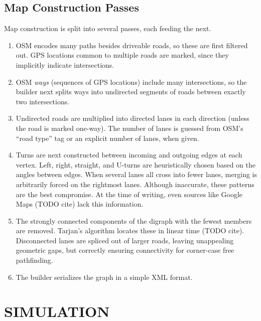 \documentclass[letterpaper, 10 pt, conference]{ieeeconf}  %
\begin{document}
\subsection{Map Construction Passes}


Map construction is split into several passes, each feeding the next.
\begin{enumerate}
  \item OSM encodes many paths besides driveable roads, so these are first
        filtered out. GPS locations common to multiple roads are marked, since
        they implicitly indicate intersections.
  \item OSM \emph{ways} (sequences of GPS locations) include many
        intersections, so the builder next splits ways into undirected
        segments of roads between exactly two intersections.
  \item Undirected roads are multiplied into directed lanes in each direction
        (unless the road is marked one-way). The number of lanes is guessed from
        OSM's ``road type'' tag or an explicit number of lanes, when given.
  \item Turns are next constructed between incoming and outgoing edges at each
        vertex. Left, right, straight, and U-turns are heuristically chosen
        based on the angles between edges. When several lanes all cross into
        fewer lanes, merging is arbitrarily forced on the rightmost lanes.
        Although inaccurate, these patterns are the best compromise. At the
        time of writing, even sources like Google Maps (TODO cite) lack this
        information.
  \item The strongly connected components of the digraph with the fewest
        members are removed. Tarjan's algorithm locates these in linear time
        (TODO cite). Disconnected lanes are spliced out of larger roads, leaving
        unappealing geometric gaps, but correctly ensuring connectivity for
        corner-case free pathfinding.
  \item The builder serializes the graph in a simple XML format.
\end{enumerate}


\section{SIMULATION}
\end{document}

